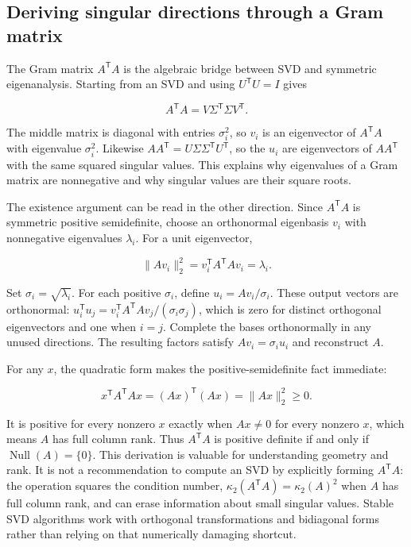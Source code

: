 \subsection{Deriving singular directions through a Gram matrix}\label{02-foundations-ii-ch024-deriving-singular-directions-through-a-gram-matrix}

\hypertarget{02-foundations-ii-ch024-deriving-singular-directions-through-a-gram-matrix}{}

The Gram matrix \(A^\mathsf T A\) is the algebraic bridge between SVD and symmetric eigenanalysis. Starting from an SVD and using \(U^\mathsf T U=I\) gives

\[
A^\mathsf T A=V\Sigma^\mathsf T\Sigma V^\mathsf T.
\]

The middle matrix is diagonal with entries \(\sigma_i^2\), so \(v_i\) is an eigenvector of \(A^\mathsf T A\) with eigenvalue \(\sigma_i^2\). Likewise \(AA^\mathsf T=U\Sigma\Sigma^\mathsf T U^\mathsf T\), so the \(u_i\) are eigenvectors of \(AA^\mathsf T\) with the same squared singular values. This explains why eigenvalues of a Gram matrix are nonnegative and why singular values are their square roots.

The existence argument can be read in the other direction. Since \(A^\mathsf T A\) is symmetric positive semidefinite, choose an orthonormal eigenbasis \(v_i\) with nonnegative eigenvalues \(\lambda_i\). For a unit eigenvector,

\[
\|Av_i\|_2^2=v_i^\mathsf T A^\mathsf T A v_i=\lambda_i.
\]

Set \(\sigma_i=\sqrt{\lambda_i}\). For each positive \(\sigma_i\), define \(u_i=Av_i/\sigma_i\). These output vectors are orthonormal: \(u_i^\mathsf T u_j=v_i^\mathsf T A^\mathsf T A v_j/(\sigma_i\sigma_j)\), which is zero for distinct orthogonal eigenvectors and one when \(i=j\). Complete the bases orthonormally in any unused directions. The resulting factors satisfy \(Av_i=\sigma_i u_i\) and reconstruct \(A\).

For any \(x\), the quadratic form makes the positive-semidefinite fact immediate:

\[
x^\mathsf T A^\mathsf T A x=(Ax)^\mathsf T(Ax)=\|Ax\|_2^2\ge0.
\]

It is positive for every nonzero \(x\) exactly when \(Ax\ne0\) for every nonzero \(x\), which means \(A\) has full column rank. Thus \(A^\mathsf T A\) is positive definite if and only if \(\operatorname{Null}(A)=\{0\}\). This derivation is valuable for understanding geometry and rank. It is not a recommendation to compute an SVD by explicitly forming \(A^\mathsf T A\): the operation squares the condition number, \(\kappa_2(A^\mathsf T A)=\kappa_2(A)^2\) when \(A\) has full column rank, and can erase information about small singular values. Stable SVD algorithms work with orthogonal transformations and bidiagonal forms rather than relying on that numerically damaging shortcut.

